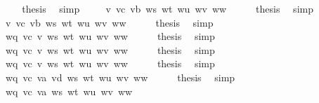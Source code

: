 \begin{isabellebody}
\ \ \isamarkupfalse%
\ \isamarkupfalse%
\ {\isacharquery}{\kern0pt}thesis\ \isamarkupfalse%
\ simp\isanewline
{}\isamarkupfalse%
\isanewline
\ \ \isamarkupfalse%
\ {\isacharparenleft}{\kern0pt}{}{}\ v\ vc\ vb\ ws\ wt\ wu\ wv\ ww{\isacharparenright}{\kern0pt}\isanewline
\ \ \isamarkupfalse%
\ \isamarkupfalse%
\ {\isacharquery}{\kern0pt}thesis\ \isamarkupfalse%
\ simp\isanewline
{}\isamarkupfalse%
\isanewline
\ \ \isamarkupfalse%
\ {\isacharparenleft}{\kern0pt}{}{}\ v\ vc\ vb\ ws\ wt\ wu\ wv\ ww{\isacharparenright}{\kern0pt}\isanewline
\ \ \isamarkupfalse%
\ \isamarkupfalse%
\ {\isacharquery}{\kern0pt}thesis\ \isamarkupfalse%
\ simp\isanewline
{}\isamarkupfalse%
\isanewline
\ \ \isamarkupfalse%
\ {\isacharparenleft}{\kern0pt}{}{}\ wq\ vc\ v\ ws\ wt\ wu\ wv\ ww{\isacharparenright}{\kern0pt}\isanewline
\ \ \isamarkupfalse%
\ \isamarkupfalse%
\ {\isacharquery}{\kern0pt}thesis\ \isamarkupfalse%
\ simp\isanewline
{}\isamarkupfalse%
\isanewline
\ \ \isamarkupfalse%
\ {\isacharparenleft}{\kern0pt}{}{}\ wq\ vc\ v\ ws\ wt\ wu\ wv\ ww{\isacharparenright}{\kern0pt}\isanewline
\ \ \isamarkupfalse%
\ \isamarkupfalse%
\ {\isacharquery}{\kern0pt}thesis\ \isamarkupfalse%
\ simp\isanewline
{}\isamarkupfalse%
\isanewline
\ \ \isamarkupfalse%
\ {\isacharparenleft}{\kern0pt}{}{}\ wq\ vc\ v\ ws\ wt\ wu\ wv\ ww{\isacharparenright}{\kern0pt}\isanewline
\ \ \isamarkupfalse%
\ \isamarkupfalse%
\ {\isacharquery}{\kern0pt}thesis\ \isamarkupfalse%
\ simp\isanewline
{}\isamarkupfalse%
\isanewline
\ \ \isamarkupfalse%
\ {\isacharparenleft}{\kern0pt}{}{}\ wq\ vc\ va\ vd\ ws\ wt\ wu\ wv\ ww{\isacharparenright}{\kern0pt}\isanewline
\ \ \isamarkupfalse%
\ \isamarkupfalse%
\ {\isacharquery}{\kern0pt}thesis\ \isamarkupfalse%
\ simp\isanewline
{}\isamarkupfalse%
\isanewline
\ \ \isamarkupfalse%
\ {\isacharparenleft}{\kern0pt}{}{}\ wq\ vc\ va\ ws\ wt\ wu\ wv\ ww{\isacharparenright}{\kern0pt}\isanewline

\end{isabellebody}
